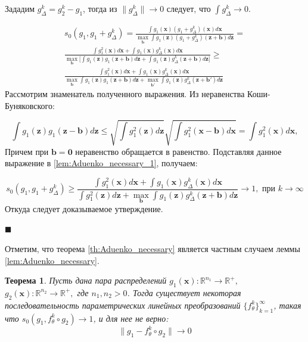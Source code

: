 \documentclass[12pt]{extarticle}
\newtheorem{theorem}{Теорема}
\newenvironment{Proof} %
    {\par\noindent{\bf Доказательство.}} %
    {\hfill$\scriptstyle\blacksquare$} %
\newcommand{\bfx}{\mathbf{x}}
\newcommand{\bfz}{\mathbf{z}}
\newcommand{\bfb}{\mathbf{b}}
\begin{document}
\begin{Proof}%

Зададим $g^k_\Delta = g^k_2 - g_1$, тогда из $\|g^k_\Delta\| \to 0$ следует, что $\int g^k_\Delta \to 0$.

\begin{multline}
    \label{lem:Aduenko_necessary_1}
    s_0(g_1, g_1 + g^k_\Delta) = \frac{\int g_1(\bfx) (g_1 + g^k_\Delta)(\bfx)d\bfx}{\max_{\bfb} \int g_1(\bfz) (g_1 + g^k_\Delta)(\bfz + \bfb) d\bfz} = \\ \frac{\int g^2_1(\bfx)d\bfx + \int g_1(\bfx) g^k_\Delta(\bfx)d\bfx }{\max_{\bfb} \Big[ \int g_1(\bfz) g_1(\bfz + \bfb) d\bfz + \int g_1(\bfz) g^k_\Delta(\bfz + \bfb) d\bfz \Big]} \geq \\ \frac{\int g^2_1(\bfx)d\bfx + \int g_1(\bfx) g^k_\Delta(\bfx)d\bfx }{\max_{\bfb} \int g_1(\bfz) g_1(\bfz + \bfb) d\bfz + \max_{\bfb'} \int g_1(\bfz) g^k_\Delta(\bfz + \bfb') d\bfz }
\end{multline}
Рассмотрим знаменатель полученного выражения. Из неравенства Коши-Буняковского:

$$ \int g_1(\bfz)g_1(\bfz - \bfb)d\bfz \leq \sqrt{\int g^2_1(\bfz)d\bfz} \sqrt{\int g^2_1(\bfx - \bfb)d\bfx} = \int g^2_1(\bfx)d\bfx,$$
Причем при $\bfb = \mathbf{0}$ неравенство обращается в равенство. Подставляя данное выражение в \eqref{lem:Aduenko_necessary_1}, получаем:

$$ s_0(g_1, g_1 + g^k_\Delta) \geq \frac{\int g^2_1(\bfx)d\bfx + \int g_1(\bfx) g^k_\Delta(\bfx)d\bfx }{ \int g^2_1(\bfz) d\bfz + \max_{\bfb} \int g_1(\bfz) g^k_\Delta(\bfz + \bfb) d\bfz } \to 1, \text{ при } k\to \infty$$
Откуда следует доказываемое утверждение.

\end{Proof}

Отметим, что теорема \ref{th:Aduenko_necessary} является частным случаем леммы \ref{lem:Aduenko_necessary}.

\begin{theorem}
\label{th:Aduenko_not_sufficient} 
Пусть дана пара распределений $g_1(\bfx): \mathbb{R}^{n_1} \to \mathbb{R}^+,$ $g_2(\bfx): \mathbb{R}^{n_2} \to \mathbb{R}^+,$ где $n_1, n_2 > 0$. Тогда существует некоторая последовательность параметрических линейных преобразований $\{f^k_{\theta}\}^\infty_{k=1}$, такая что $s_0(g_1, f^k_\theta\circ g_2) \to 1$, и для нее не верно:
$$\|g_1 - f^k_\theta\circ g_2\| \to 0$$
\end{theorem}
\end{document}
